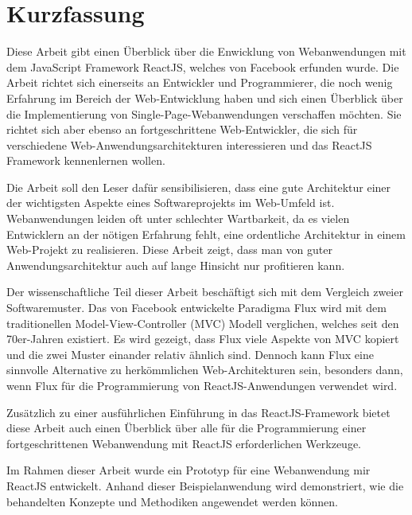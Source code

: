 \chapter*{Kurzfassung}

Diese Arbeit gibt einen Überblick über die Enwicklung von Webanwendungen mit dem JavaScript Framework ReactJS, welches von Facebook erfunden wurde. Die Arbeit richtet sich einerseits an Entwickler und Programmierer, die noch wenig Erfahrung im Bereich der Web-Entwicklung haben und sich einen Überblick über die Implementierung von Single-Page-Webanwendungen verschaffen möchten. Sie richtet sich aber ebenso an fortgeschrittene Web-Entwickler, die sich für verschiedene Web-Anwendungsarchitekturen interessieren und das ReactJS Framework kennenlernen wollen.

Die Arbeit soll den Leser dafür sensibilisieren, dass eine gute Architektur einer der wichtigsten Aspekte eines Softwareprojekts im Web-Umfeld ist. Webanwendungen leiden oft unter schlechter Wartbarkeit, da es vielen Entwicklern an der nötigen Erfahrung fehlt, eine ordentliche Architektur in einem Web-Projekt zu realisieren. Diese Arbeit zeigt, dass man von guter Anwendungsarchitektur auch auf lange Hinsicht nur profitieren kann.

Der wissenschaftliche Teil dieser Arbeit beschäftigt sich mit dem Vergleich zweier Softwaremuster. Das von Facebook entwickelte Paradigma Flux wird mit dem traditionellen Model-View-Controller (MVC) Modell verglichen, welches seit den 70er-Jahren existiert. Es wird gezeigt, dass Flux viele Aspekte von MVC kopiert und die zwei Muster einander relativ ähnlich sind. Dennoch kann Flux eine sinnvolle Alternative zu herkömmlichen Web-Architekturen sein, besonders dann, wenn Flux für die Programmierung von ReactJS-Anwendungen verwendet wird.

Zusätzlich zu einer ausführlichen Einführung in das ReactJS-Framework bietet diese Arbeit auch einen Überblick über alle für die Programmierung einer fortgeschrittenen Webanwendung mit ReactJS erforderlichen Werkzeuge.

Im Rahmen dieser Arbeit wurde ein Prototyp für eine Webanwendung mir ReactJS entwickelt. Anhand dieser Beispielanwendung wird demonstriert, wie die behandelten Konzepte und Methodiken angewendet werden können.


